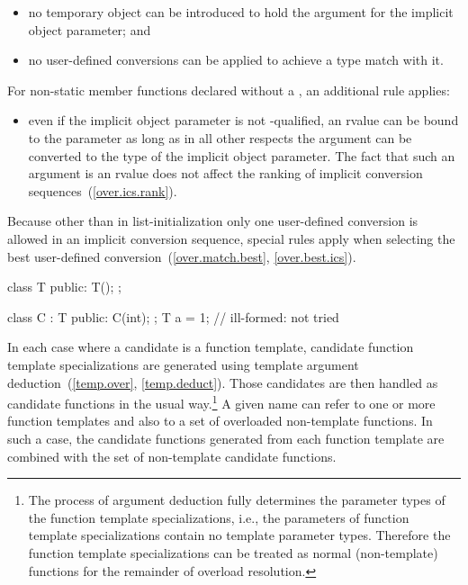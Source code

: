 \begin{itemize}
\item
no temporary object can be introduced to hold the argument
for the implicit object parameter; and
\item
no user-defined conversions can be applied to achieve a type
match with it.
\end{itemize}

%
For non-static member functions declared without a ,
an additional rule applies:

\begin{itemize}
\item
even if the implicit object parameter is not
-qualified,
an rvalue can be bound to the parameter
as long as in all other respects the argument can be
converted to the type of the implicit object parameter.
\enternote The fact that such an argument is an rvalue does not
affect the ranking of implicit conversion sequences~(\ref{over.ics.rank}).
\exitnote
\end{itemize}

\pnum
Because other than in list-initialization only one user-defined conversion
is allowed
in an
implicit conversion sequence, special rules apply when selecting
the best user-defined conversion~(\ref{over.match.best},
\ref{over.best.ics}).
\enterexample

\begin{codeblock}
class T {
public:
  T();
};

class C : T {
public:
  C(int);
};
T a = 1;            // ill-formed:  not tried
\end{codeblock}
\exitexample

\pnum
In each case where a candidate is a function template, candidate
function template specializations
are generated using template argument deduction~(\ref{temp.over},
\ref{temp.deduct}).
Those candidates are then handled as candidate
functions in the usual way.\footnote{The process of argument deduction fully
determines the parameter types of
the
function template specializations,
i.e., the parameters of
function template specializations
contain
no template parameter types.
Therefore the
function template specializations
can be
treated as normal (non-template) functions for the remainder of overload
resolution.}
A given name can refer to one or more function templates and also
to a set of overloaded non-template functions.
In such a case, the
candidate functions generated from each function template are combined
with the set of non-template candidate functions.

